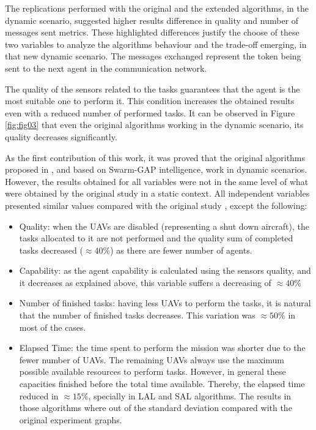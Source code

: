 The replications performed with the original and the extended algorithms, in the dynamic scenario, suggested higher results difference in quality and number of messages sent metrics. These highlighted differences justify the choose of these two variables to analyze the algorithms behaviour and the trade-off emerging, in that new dynamic scenario. The messages exchanged represent the token being sent to the next agent in the communication network.

The quality of the sensors related to the tasks guarantees that the agent is the most suitable one to perform it. This condition increases the obtained results even with a reduced number of performed tasks. It can be observed in Figure \ref{fig:fig03} that even the original algorithms working in the dynamic scenario, its quality decreases significantly. 

As the first contribution of this work, it was proved that the original algorithms proposed in \cite{MAS07}, and based on Swarm-GAP intelligence, work in dynamic scenarios. However, the results obtained for all variables were not in the same level of what were obtained by the original study in a static context. All independent variables presented similar values compared with the original study \cite{MAS07}, except the following:

\begin{itemize}
   \item Quality: when the UAVs are disabled (representing a shut down aircraft), the tasks allocated to it are not performed and the quality sum of completed tasks decreased ($\approx 40\%$) as there are fewer number of agents.
   \item Capability: as the agent capability is calculated using the sensors quality,  and it decreases as explained above, this variable suffers a decreasing of $\approx 40\%$
   \item Number of finished tasks: having less UAVs to perform the tasks, it is natural that the number of finished tasks decreases. This variation was $\approx 50\%$ in most of the cases.
   \item Elapsed Time: the time spent to perform the mission was shorter due to the fewer number of UAVs. The remaining UAVs always use the maximum possible available resources to perform tasks. However, in general these capacities finished before the total time available.  Thereby, the elapsed time reduced in $\approx 15\%$, specially in LAL and SAL algorithms. The results in those algorithms where out of the standard deviation compared with the original experiment graphs.
\end{itemize}

